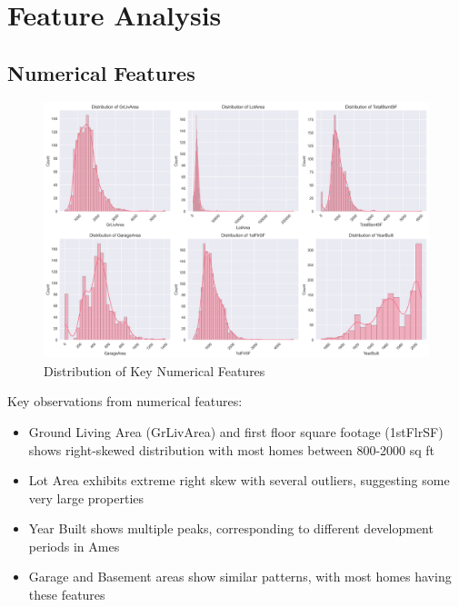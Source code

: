 \section{Feature Analysis}
\subsection{Numerical Features}
\begin{figure}[H]
    \centering
    \includegraphics[width=1.0\textwidth]{figures/numerical_features_dist.png}
    \caption{Distribution of Key Numerical Features}
    \label{fig:num_features_dist}
\end{figure}

Key observations from numerical features:
\begin{itemize}
    \item Ground Living Area (GrLivArea) and first floor square footage (1stFlrSF) shows right-skewed distribution with most homes between 800-2000 sq ft
    \item Lot Area exhibits extreme right skew with several outliers, suggesting some very large properties 
    \item Year Built shows multiple peaks, corresponding to different development periods in Ames
    \item Garage and Basement areas show similar patterns, with most homes having these features
\end{itemize}

